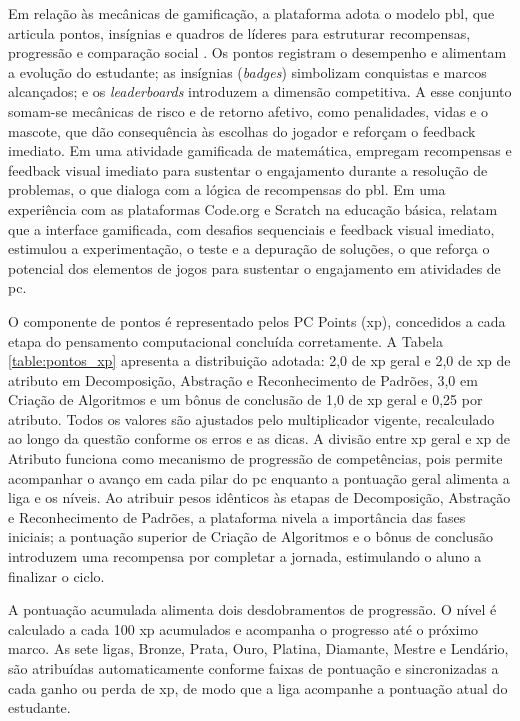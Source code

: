 Em relação às mecânicas de gamificação, a plataforma adota o modelo \gls{pbl},
que articula pontos, insígnias e quadros de líderes para estruturar recompensas,
progressão e comparação social \cite{silpasuwanchai2016developing}. Os pontos
registram o desempenho e alimentam a evolução do estudante; as insígnias
(\textit{badges}) simbolizam conquistas e marcos alcançados; e os
\textit{leaderboards} introduzem a dimensão competitiva. A esse conjunto somam-se
mecânicas de risco e de retorno afetivo, como penalidades, vidas e o mascote, que
dão consequência às escolhas do jogador e reforçam o feedback imediato. Em uma
atividade gamificada de matemática,  empregam
recompensas e feedback visual imediato para sustentar o engajamento durante a
resolução de problemas, o que dialoga com a lógica de recompensas do \gls{pbl}.
Em uma experiência com
as plataformas Code.org e Scratch na educação básica, 
relatam que a interface gamificada, com desafios sequenciais e feedback visual
imediato, estimulou a experimentação, o teste e a depuração de soluções, o que
reforça o potencial dos elementos de jogos para sustentar o engajamento em
atividades de \gls{pc}.

O componente de pontos é representado pelos PC Points (\gls{xp}), concedidos a
cada etapa do pensamento computacional concluída corretamente. A Tabela
\ref{table:pontos_xp} apresenta a distribuição adotada: 2,0 de \gls{xp} geral e
2,0 de \gls{xp} de atributo em Decomposição, Abstração e Reconhecimento de
Padrões, 3,0 em Criação de Algoritmos e um bônus de conclusão de 1,0 de \gls{xp}
geral e 0,25 por atributo. Todos os valores são ajustados pelo multiplicador
vigente, recalculado ao longo da questão conforme os erros e as dicas. A divisão
entre \gls{xp} geral e \gls{xp} de
Atributo funciona como mecanismo de progressão de competências, pois permite
acompanhar o avanço em cada pilar do \gls{pc} enquanto a pontuação geral alimenta
a liga e os níveis. Ao atribuir pesos idênticos às etapas de Decomposição,
Abstração e Reconhecimento de Padrões, a plataforma nivela a importância das
fases iniciais; a pontuação superior de Criação de Algoritmos e o bônus de
conclusão introduzem uma recompensa por completar a jornada, estimulando o aluno
a finalizar o ciclo.

A pontuação acumulada alimenta dois desdobramentos de progressão. O nível é
calculado a cada 100 \gls{xp} acumulados e acompanha o progresso até o próximo
marco. As sete ligas, Bronze, Prata, Ouro, Platina, Diamante, Mestre e Lendário,
são atribuídas automaticamente conforme faixas de pontuação e sincronizadas a
cada ganho ou perda de \gls{xp}, de modo que a liga acompanhe a pontuação atual do
estudante.

